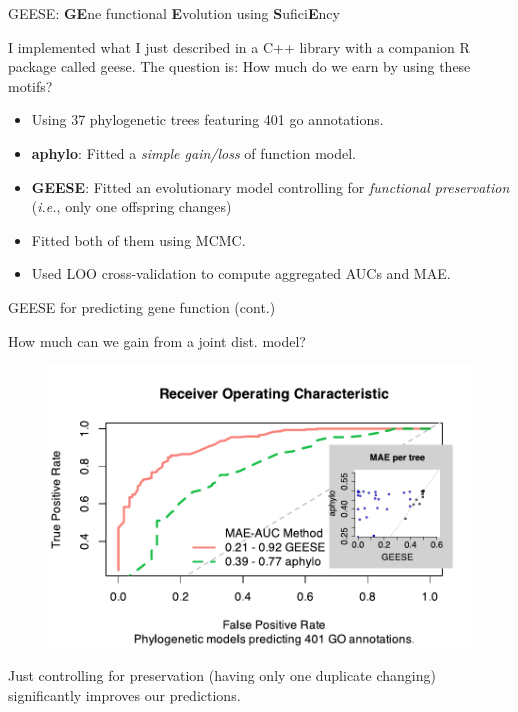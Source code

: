 \documentclass[10pt,aspectratio=169]{beamer}
\newcounter{frame}[frame]
\begin{document}
\begin{frame}{GEESE: \textbf{GE}ne functional \textbf{E}volution using \textbf{S}ufici\textbf{E}ncy}

I implemented what I just described in a C++ library with a companion R package called geese. The question is: How much do we earn by using these motifs?\\\bigskip
\pause
\begin{itemize}[<+->]
    \item Using 37 phylogenetic trees featuring 401 go annotations.
    \item \textbf{aphylo}: Fitted a \textit{simple gain/loss} of function model.
    \item \textbf{GEESE}: Fitted an evolutionary model controlling for \textit{functional preservation} (\textit{i.e.}, only one offspring changes)
    \item Fitted both of them using MCMC.
    \item Used LOO cross-validation to compute aggregated AUCs and MAE.
\end{itemize}
\end{frame}

\begin{frame}{GEESE for predicting gene function (cont.)}

How much can we gain from a joint dist. model?
    
\begin{figure}
\centering
    \includegraphics[width = .7\linewidth]{fig/mcmc-analysis-unif-prior-curated-auc-and-mae.pdf}
    \label{fig:auc-geese-vs-aphylo}
\end{figure}

Just controlling for preservation (having only one duplicate changing) significantly improves our predictions.
    
\end{frame}
\end{document}
